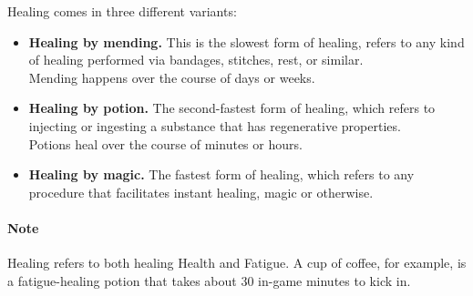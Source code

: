 Healing comes in three different variants:

\begin{center}
  \begin{itemize}
  \item \textbf{Healing by mending.}
    This is the slowest form of healing, refers to any kind of healing performed via bandages, stitches, rest, or similar.\\
    Mending happens over the course of days or weeks.
  \item \textbf{Healing by potion.}
    The second-fastest form of healing, which refers to injecting or ingesting a substance that has regenerative properties. \\
    Potions heal over the course of minutes or hours.
  \item \textbf{Healing by magic.}
    The fastest form of healing, which refers to any procedure that facilitates instant healing, magic or otherwise.
  \end{itemize}
\end{center}

\paragraph{Note} Healing refers to both healing Health and Fatigue.
A cup of coffee, for example, is a fatigue-healing potion that takes about 30 in-game minutes to kick in.
